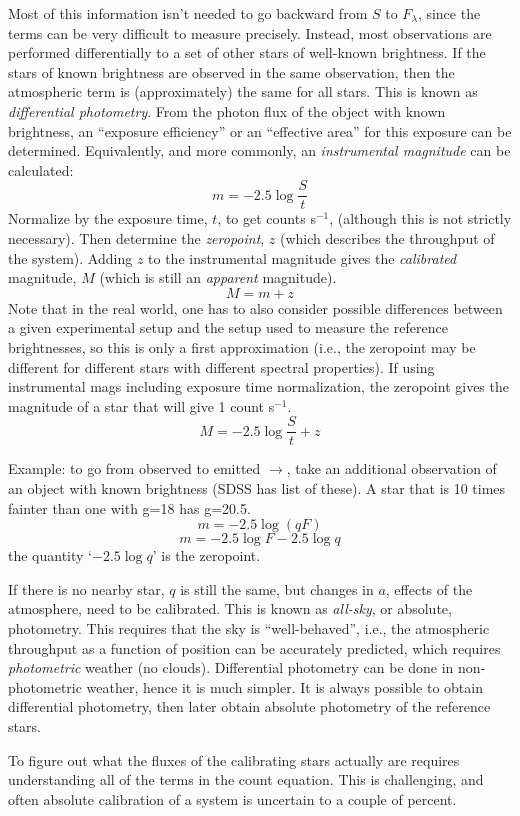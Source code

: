 \documentclass[12pt]{article}
\begin{document}
Most of this information isn't needed to go
backward from $S$ to $F_{\lambda}$, since
the terms can be very difficult to measure precisely.
Instead, most observations are performed differentially to a
set of other stars of well-known brightness. If the stars of known
brightness are observed in the same observation, then the atmospheric
term is (approximately) the same for all stars.
This is known as
\emph{differential photometry}.
From the photon flux of the object with known brightness,
an ``exposure efficiency'' or an ``effective area'' for this
exposure can be determined.
Equivalently, and more commonly, an
\emph{instrumental magnitude} can be calculated:
    $$  m = -2.5 \log \frac{S}{t} $$
Normalize by the exposure time, $t$, to get counts s$^{-1}$,
(although this is not strictly necessary).
Then determine the \emph{zeropoint}, $z$ (which describes the
throughput of the system).
Adding $z$ to the instrumental magnitude gives the
\emph{calibrated} magnitude, $M$
(which is still an \emph{apparent} magnitude).
    $$ M = m + z $$
Note that in the real world, one has to also consider possible
differences between a given experimental setup and the setup used to
measure the reference brightnesses, so this is only a first
approximation (i.e., the zeropoint may be different for different
stars with different spectral properties). If using instrumental mags
including exposure time normalization, the zeropoint gives the
magnitude of a star that will give 1 count s$^{-1}$.
    $$ M = -2.5\log\frac{S}{t}+z $$

Example: to go from observed to emitted $\rightarrow$,
take an additional observation of an object with known brightness
(SDSS has list of these).
A star that is 10 times fainter than one with g=18 has g=20.5.
    $$ m = -2.5 \log(qF)$$
    $$ m = -2.5 \log F - 2.5\log q $$
the quantity `$-2.5\log q$' is the zeropoint.

If there is no nearby star, $q$ is still the same, but changes in $a$,
effects of the atmosphere, need to be calibrated.
This is known as \emph{all-sky}, or absolute, photometry.
This requires that the sky is ``well-behaved'',
i.e., the atmospheric throughput as a function of position can be
accurately predicted, which requires \emph{photometric} weather
(no clouds).
Differential photometry can be done in non-photometric weather,
hence it is much simpler. It is always possible to obtain
differential photometry, then later obtain absolute
photometry of the reference stars.

To figure out what the fluxes of the calibrating stars actually are
requires understanding all of the terms in the count equation.
This is challenging, and often absolute calibration of a system is
uncertain to a couple of percent.
\end{document}
